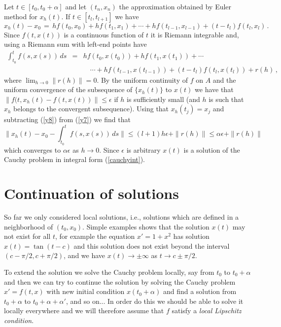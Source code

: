 \documentclass[12pt]{report}
\newcommand{\nn}{\nonumber}
\def\eqref#1{(\ref{#1})}
\def\qed{\hbox{\hskip 6pt\vrule width6pt height7pt depth1pt
    \hskip1pt}\bigskip}
\def\to{\rightarrow}
\begin{document}
Let $t \in [t_0, t_0 +\alpha]$ and let $(t_n, x_n)$ the approximation
obtained by Euler method for $x_h(t)$.  If $t \in [t_l, t_{l+1}]$ we
have
\begin{equation}\label{y7}
x_h(t) - x_0 \,=\, h f(t_0, x_0) + h f(t_1, x_1) + \cdots + h
f(t_{l-1}, x_{l-1}) + (t-t_l) f(t_l, x_l)\,.
\end{equation}  
Since $f(t, x(t))$ is a continuous function of $t$ it is Riemann
integrable and, using a Riemann sum with left-end points have
\begin{eqnarray}
\int_{t_0}^t f(s, x(s)) \,ds &=&   h f(t_0, x(t_0)) + h f(t_1, x(t_1)) +
\cdots  \nn \\
 &&\quad  \cdots + h f(t_{l-1}, x(t_{l-1})) + (t-t_l) f(t_l, x(t_l)) + r(h) 
\,,\label{y8}
\end{eqnarray} 
where $\lim_{h\to 0} \|r(h)\| =0$.  By the uniform continuity of $f$
on $A$ and the uniform convergence of the subsequence of $\{x_h(t)\}$
to $x(t)$ we have that $\|f(t,x_h(t) - f(t, x(t))\| \leq \epsilon$ if
$h$ is sufficiently small (and $h$ is such that $x_h$ belongs to the
convergent subsequence).  Using that $x_h(t_j)=x_j$ and subtracting
\eqref{y8} from \eqref{y7} we find that
\begin{equation}
\|x_h(t) - x_0 - \int_{t_0}^t f(s, x(s)) \,ds \| \le (l+1) h \epsilon
+ \|r(h)\| \le \alpha \epsilon + \|r(h)\|
\end{equation}
which converges to $\alpha \epsilon$ as $h \to 0$. Since $\epsilon$ is
arbitrary $x(t)$ is a solution of the Cauchy problem in integral form
\eqref{cauchyint}.  \hfill \qed


\section{Continuation of solutions}

So far we only considered local solutions, i.e., solutions which are
defined in a neighborhood of $(t_0,x_0)$.  Simple examples shows that
the solution $x(t)$ may not exist for all $t$, for example the
equation $x'=1+x^2$ has solution $x(t) = \tan(t-c)$ and this solution
does not exist beyond the interval $(c -\pi/2, c+ \pi/2)$, and we have
$x(t) \to \pm \infty$ as $t \to c \pm \pi/2$.  


To extend the solution we solve the Cauchy problem locally, say from
$t_0$ to $t_0 +\alpha$ and then we can try to continue the solution by
solving the Cauchy problem $x'=f(t,x)$ with new initial condition
$x(t_0+\alpha)$ and find a solution from $t_0+\alpha$ to $t_0+\alpha +
\alpha'$, and so on... In order do this we should be able to solve it
locally everywhere and we will therefore assume that $f$ satisfy a {\em local
Lipschitz condition}. 
\end{document}
